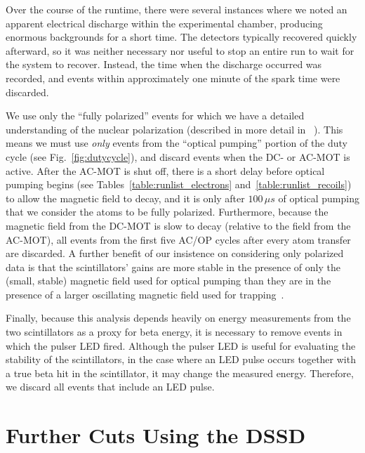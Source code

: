 Over the course of the runtime, there were several instances where we noted an apparent electrical discharge within the experimental chamber, producing enormous backgrounds for a short time.  The detectors typically recovered quickly afterward, so it was neither necessary nor useful to stop an entire run to wait for the system to recover.  Instead, the time when the discharge occurred was recorded, and events within approximately one minute of the spark time were discarded.  

We use only the ``fully polarized'' events for which we have a detailed understanding of the nuclear polarization (described in more detail in ~\cite{ben_OP}).  This means we must use \emph{only} events from the ``optical pumping'' portion of the duty cycle (see Fig.~\ref{fig:dutycycle}), and discard events when the DC- or AC-MOT is active.  After the AC-MOT is shut off, there is a short delay before optical pumping begins (see Tables~\ref{table:runlist_electrons} and~\ref{table:runlist_recoils}) to allow the magnetic field to decay, and it is only after $100\,\mu s$ of optical pumping that we consider the atoms to be fully polarized.  Furthermore, because the magnetic field from the DC-MOT is slow to decay (relative to the field from the AC-MOT), all events from the first five AC/OP cycles after every atom transfer are discarded.  A further benefit of our insistence on considering only polarized data is that the scintillators' gains are more stable in the presence of only the (small, stable) magnetic field used for optical pumping than they are in the presence of a larger oscillating magnetic field used for trapping~\cite{ben_thesis}.

Finally, because this analysis depends heavily on energy measurements from the two scintillators as a proxy for beta energy, it is necessary to remove events in which the pulser LED fired.  Although the pulser LED is useful for evaluating the stability of the scintillators, in the case where an LED pulse occurs together with a true beta hit in the scintillator, it may change the measured energy.  Therefore, we discard all events that include an LED pulse.   
	


\section{Further Cuts Using the DSSD}
\label{sec:dssd_cuts}


